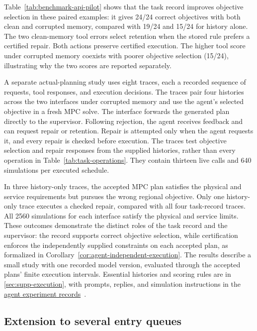 \documentclass[preprint,12pt]{elsarticle}
\theoremstyle{definition}
\theoremstyle{plain}
\theoremstyle{definition}
\theoremstyle{plain}
\newcommand{\appref}[1]{\ref{#1}}
\newcommand{\reproductiondetails}[1]{\href{https://github.com/AlienEslami/agentic-perimeter-runtime-certification/releases/tag/paper-2026-11-10}{#1}~\cite{perimeterReproductionGuide}}
\begin{document}
Table~\ref{tab:benchmark-api-pilot} shows that the task record improves
objective selection in these paired examples: it gives 24/24 correct
objectives with both clean and corrupted memory, compared with 19/24 and
15/24 for history alone. The two clean-memory tool errors select
retention when the stored rule prefers a certified repair. Both actions
preserve certified execution. The higher tool score under corrupted
memory coexists with poorer objective selection (15/24), illustrating
why the two scores are reported separately.

A separate actual-planning study uses eight
traces, each a recorded sequence of requests, tool responses, and execution
decisions. The traces pair four histories across the two interfaces under
corrupted memory and use the agent's selected objective in a fresh MPC
solve. The interface forwards the generated plan directly to the
supervisor. Following rejection, the agent receives feedback and can request
repair or retention. Repair is attempted only when the agent requests it,
and every repair is checked before execution. The traces test objective
selection and repair responses from the supplied histories, rather than
every operation in Table~\ref{tab:task-operations}.
They contain thirteen live calls and 640 simulations per executed schedule.

In three history-only traces, the accepted MPC plan satisfies the physical
and service requirements but pursues the wrong regional objective.
Only one history-only trace executes a checked repair, compared with
all four task-record traces. All 2560 simulations for each interface satisfy
the physical and service limits. These outcomes demonstrate the distinct
roles of the task record and the supervisor: the record supports correct
objective selection, while certification enforces the independently
supplied constraints on each accepted plan, as formalized in
Corollary~\ref{cor:agent-independent-execution}. The results describe a small
study with one recorded model version, evaluated through the accepted
plans' finite execution intervals. Essential histories and scoring rules
are in \appref{sec:supp-execution}, with prompts, replies, and simulation
instructions in the \reproductiondetails{agent experiment records}.

\subsection{Extension to several entry queues}
\label{sec:network-transfer-results}
\end{document}
